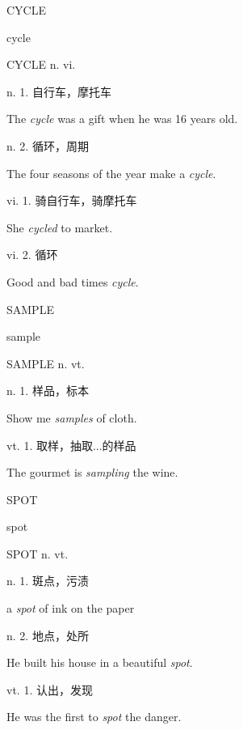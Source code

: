 \begin{flashcard}{
CYCLE

cycle
}
\begin{center}
CYCLE n. vi. 
\end{center}
n. 1. 自行车，摩托车

The \textit{cycle} was a gift when he was 16 years old.

n. 2. 循环，周期

The four seasons of the year make a \textit{cycle}.

vi. 1. 骑自行车，骑摩托车

She \textit{cycled} to market.

vi. 2. 循环

Good and bad times \textit{cycle}.

\end{flashcard}
\begin{flashcard}{
SAMPLE

sample
}
\begin{center}
SAMPLE n. vt. 
\end{center}
n. 1. 样品，标本

Show me \textit{samples} of cloth.

vt. 1. 取样，抽取...的样品

The gourmet is \textit{sampling} the wine.

\end{flashcard}
\begin{flashcard}{
SPOT

spot
}
\begin{center}
SPOT n. vt. \textipa{[sp\textopeno t]}
\end{center}
n. 1. 斑点，污渍

a \textit{spot} of ink on the paper

n. 2. 地点，处所

He built his house in a beautiful \textit{spot}.

vt. 1. 认出，发现

He was the first to \textit{spot} the danger.

\end{flashcard}
